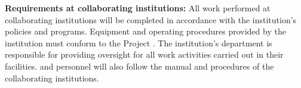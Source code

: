 {\bf Requirements at collaborating %
institutions:} All work performed at collaborating institutions will be completed in accordance with the %
institution's  policies and programs. 
Equipment and operating procedures provided by the %
institution must conform to the  Project . %
The %
institution's  department is responsible for providing   oversight for all work activities carried out in their facilities. %
 and  personnel will also follow the  manual and procedures of the collaborating institutions.






